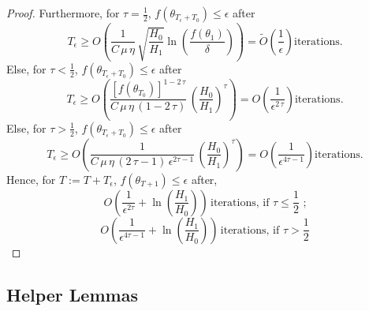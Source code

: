 \documentclass{article}
\begin{document}
\begin{proof}
Furthermore, for $\tau = \frac{1}{2}$, $f(\theta_{T_\epsilon + T_0}) \leq \epsilon$ after 
\[
T_\epsilon \geq O \left( \frac{1}{C \, \mu \, \eta} \, \sqrt{\frac{H_0}{H_1} }\ln\left(\frac{f(\theta_1)}{\delta}\right) \right) = \tilde{O} \left( \frac{1}{\epsilon} \right) \text{iterations}. 
\] 
Else, for $\tau < \frac{1}{2}$, $f(\theta_{T_\epsilon + T_0}) \leq \epsilon$ after 
\[
T_\epsilon \geq O \left(\frac{[f(\theta_{T_0})]^{1 - 2 \, \tau}}{C \, \mu \, \eta \, (1 - 2 \, \tau)} \, \left( \frac{H_0}{H_1} \right)^\tau \right) = O \left( \frac{1}{\epsilon^{2 \, \tau}} \right) \text{iterations}. 
\]
Else, for $\tau > \frac{1}{2}$, $f(\theta_{T_\epsilon + T_0}) \leq \epsilon$ after 
\[
T_\epsilon \geq O \left(\frac{1}{C \, \mu \, \eta \, (2 \, \tau - 1) \, \epsilon^{2 \tau - 1}} \, \left( \frac{H_0}{H_1} \right)^\tau \right) = O \left( \frac{1}{\epsilon^{4 \tau - 1}} \right) \text{iterations}. 
\]
Hence, for $T := T + T_\epsilon$, $f(\theta_{T+1}) \leq \epsilon$ after, 
\[
O \left( \frac{1}{\epsilon^{2 \tau}} + \ln \left( \frac{H_1}{H_0} \right) \right) \, \text{iterations, if $\tau \leq \frac{1}{2}$ ;}
\]
\[
O \left( \frac{1}{\epsilon^{4 \tau - 1}} + \ln \left( \frac{H_1}{H_0} \right) \right) \, \text{iterations, if $\tau > \frac{1}{2}$}
\]
\end{proof}

\subsection{Helper Lemmas}
\label{app:rms-helper-lemmas}
\end{document}
